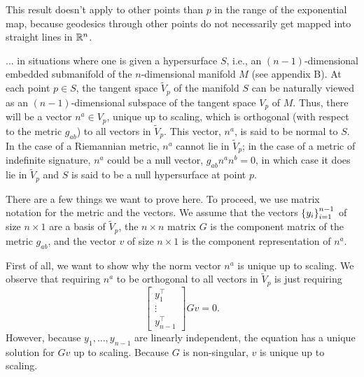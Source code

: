 \documentclass{note}
\numberwithin{equation}{chapter}
\begin{document}
This result doesn't apply to other points than $p$ in the range of the
exponential map, because geodesics through other points do not necessarily get
mapped into straight lines in $\mathbb{R}^n$.

\begin{quotebar}
    ... in situations where one is given a hypersurface $S$, i.e., an $(n -
        1)$-dimensional embedded submanifold of the $n$-dimensional manifold $M$ (see
    appendix B). At each point $p \in S$, the tangent space $\tilde{V}_p$ of the
    manifold $S$ can be naturally viewed as an $(n - 1)$-dimensional subspace of
    the tangent space $V_p$ of $M$. Thus, there will be a vector $n^a \in V_p$,
    unique up to scaling, which is orthogonal (with respect to the metric $g_{ab}$)
    to all vectors in $\tilde{V}_p$. This vector, $n^a$, is said to be normal to
    $S$. In the case of a Riemannian metric, $n^a$ cannot lie in $\tilde{V}_p$; in
    the case of a metric of indefinite signature, $n^a$ could be a null vector,
    $g_{ab}n^a n^b = 0$, in which case it does lie in $\tilde{V}_p$ and $S$ is said
    to be a null hypersurface at point $p$.
\end{quotebar}

There are a few things we want to prove here. To proceed, we use matrix
notation for the metric and the vectors. We assume that the vectors
$\set{y_i}_{i=1}^{n-1}$ of size $n\times 1$ are a basis of $\tilde{V}_p$, the
$n\times n$ matrix $G$ is the component matrix of the metric $g_{ab}$, and the
vector $v$ of size $n\times 1$ is the component representation of $n^a$.

First of all, we want to show why the norm vector $n^a$ is unique up to
scaling. We observe that requiring $n^a$ to be orthogonal to all vectors in
$\tilde{V}_p$ is just requiring
\begin{equation}
    \begin{bmatrix}
        y_1^\top \\
        \vdots   \\
        y_{n-1}^\top
    \end{bmatrix}
    Gv = 0. \label{norm-vector-being-in-hypersurface}
\end{equation}
However, because $y_1, \dots, y_{n-1}$ are linearly independent, the equation
has a unique solution for $Gv$ up to scaling. Because $G$ is non-singular, $v$
is unique up to scaling.
\end{document}
